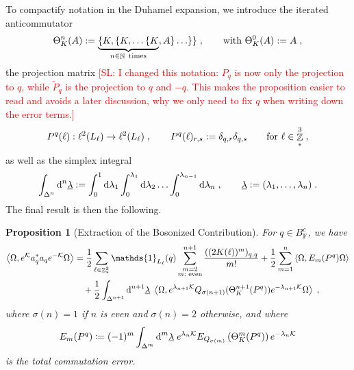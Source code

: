 \documentclass[12pt,a4paper]{article}
\numberwithin{equation}{section}
\newcommand{\cK}{\mathcal{K}}
\newcommand{\ulambda}{\underline{\lambda}}
\newcommand{\1}{\mathbb{I}}
\newcommand{\di}{\textnormal{d}}
\newcommand{\F}{\mathrm{F}}
\DeclareMathOperator{\N}{\mathbb{N}}
\DeclareMathOperator{\Z}{\mathbb{Z}}
\newcommand{\half}{\frac{1}{2}}
\newcommand{\eva}[1]{\left\langle #1 \right\rangle}
\theoremstyle{plain}
\newtheorem{proposition}[theorem]{Proposition}
\theoremstyle{definition}
\theoremstyle{remark}
\theoremstyle{plain}
\theoremstyle{definition}
\theoremstyle{remark}
\begin{document}
To compactify notation in the Duhamel expansion, we introduce the iterated anticommutator
\begin{equation} \label{eq:Theta}
	\Theta_K^n (A)
	:= \underbrace{\{ K, \{ K , \ldots \{K}_{n \in \N \textnormal{ times}} , A\} \ldots \} \} \;, \qquad
	\textnormal{with }
	\Theta_K^0 (A)
	:= A \;,
\end{equation}
the projection matrix \textcolor{red}{[SL: I changed this notation: $ P_q $ is now only the projection to $ q $, while $ \tilde{P}_q $ is the projection to $ q $ and $ -q $. This makes the proposition easier to read and avoids a later discussion, why we only need to fix $ q $ when writing down the error terms.]}
\begin{equation} \label{eq:Pq}
	P^q(\ell) : \ell^2(L_\ell) \to \ell^2(L_\ell) \;, \qquad
	P^q(\ell)_{r,s} := \delta_{q,r} \delta_{q,s} \qquad
	\textnormal{for } \ell \in \Z^3_* \;,
\end{equation}
as well as the simplex integral
\begin{equation} \label{eq:Deltan}
	\int_{\Delta^n} \di^n \ulambda
	:= \int_0^1 \di \lambda_1 \int_0^{\lambda_1} \di \lambda_2 \ldots \int_0^{\lambda_{n-1}} \di \lambda_n \;, \qquad
	\ulambda := (\lambda_1, \ldots, \lambda_n) \;.
\end{equation}
The final result is then the following.

\begin{proposition}[Extraction of the Bosonized Contribution]\label{prop:finexpan}
For $q \in B^c_{\F}$, we have
\begin{align} \label{eq:finexpan}
	\eva{\Omega, e^{\cK} a_q^* a_q e^{-\cK} \Omega} 
	&= \half\sum\limits_{\ell\in \Z^3_*}\mathds{1}_{L_\ell}(q) \sum\limits_{\substack{m=2\\m:\textnormal{ even}}}^{n+1} \frac{((2K(\ell))^m)_{q,q}}{m!}
		+ \half \sum\limits_{m=1}^{n} \eva{\Omega, E_m(P^q)\Omega}\nonumber\\
	&\quad +\half \int_{\Delta^{n+1}} \di^{n+1}\underline{\lambda} \;
		\eva{\Omega, e^{\lambda_{n+1} \cK}Q_{\sigma(n+1)}(\Theta^{n+1}_{K}(P^q)) e^{-\lambda_{n+1} \cK} \Omega} \;,
\end{align}
where $ \sigma(n) = 1 $ if $ n $ is even and $ \sigma(n) = 2 $ otherwise, and where
\begin{equation}\label{eq:errEm}
	E_m(P^q) \coloneq (-1)^m \int_{\Delta^m} \di^m\underline{\lambda} \;
		e^{\lambda_n \cK} E_{Q_{\sigma(m)}}\left(\Theta^{m}_{K}(P^q)\right) e^{-\lambda_n \cK}
\end{equation}
is the total commutation error.
\end{proposition}
\end{document}

